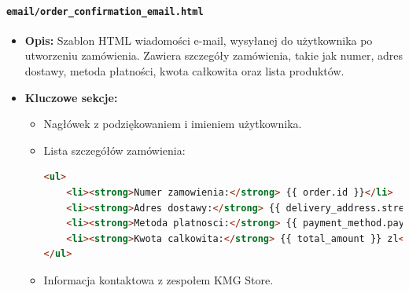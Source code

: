 \documentclass[12pt,a4paper,oneside]{article}
\theoremstyle{definition}
\numberwithin{equation}{section}
\begin{document}
\paragraph{\texttt{email/order\_confirmation\_email.html}}
\begin{itemize}
    \item \textbf{Opis:} Szablon HTML wiadomości e-mail, wysyłanej do użytkownika po utworzeniu zamówienia. Zawiera szczegóły zamówienia, takie jak numer, adres dostawy, metoda płatności, kwota całkowita oraz lista produktów.
    \item \textbf{Kluczowe sekcje:}
    \begin{itemize}
        \item Nagłówek z podziękowaniem i imieniem użytkownika.
        \item Lista szczegółów zamówienia:
        \begin{lstlisting}[language=HTML]
<ul>
    <li><strong>Numer zamowienia:</strong> {{ order.id }}</li>
    <li><strong>Adres dostawy:</strong> {{ delivery_address.street }}, {{ delivery_address.city }}</li>
    <li><strong>Metoda platnosci:</strong> {{ payment_method.payment_method }}</li>
    <li><strong>Kwota calkowita:</strong> {{ total_amount }} zl</li>
</ul>
        \end{lstlisting}
        \item Informacja kontaktowa z zespołem KMG Store.
    \end{itemize}
\end{itemize}
\end{document}
